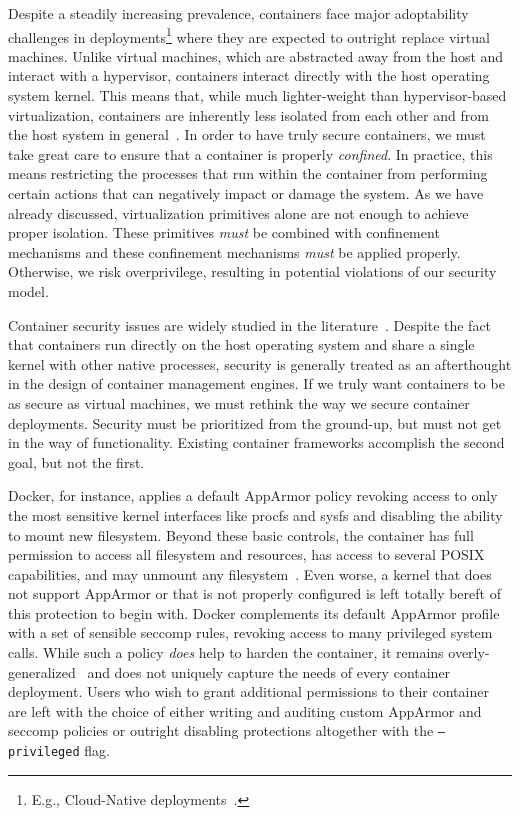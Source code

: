 Despite a steadily increasing prevalence, containers face major adoptability challenges in
deployments\footnote{E.g., Cloud-Native deployments~\cite{brady2020_docker_cloud}.} where
they are expected to outright replace virtual machines. Unlike virtual machines, which are
abstracted away from the host and interact with a hypervisor, containers interact directly
with the host operating system kernel. This means that, while much lighter-weight than
hypervisor-based virtualization, containers are inherently less isolated from each other
and from the host system in general~\cite{sultan2019_container_security,
lin2018_container_security, mullinix2020_security_measures, bui2015_docker_analysis}.  In
order to have truly secure containers, we must take great care to ensure that a container
is properly \textit{confined}. In practice, this means restricting the processes that run
within the container from performing certain actions that can negatively impact or damage
the system.  As we have already discussed, virtualization primitives alone are not enough
to achieve proper isolation. These primitives \textit{must} be combined with confinement
mechanisms and these confinement mechanisms \textit{must} be applied properly. Otherwise,
we risk overprivilege, resulting in potential violations of our security model.

Container security issues are widely studied in the
literature~\cite{sultan2019_container_security, lin2018_container_security,
mp2016_hardening, mullinix2020_security_measures, bui2015_docker_analysis}.  Despite the
fact that containers run directly on the host operating system and share a single kernel
with other native processes, security is generally treated as an afterthought in the
design of container management engines. If we truly want containers to be as secure as
virtual machines, we must rethink the way we secure container deployments. Security must
be prioritized from the ground-up, but must not get in the way of functionality. Existing
container frameworks accomplish the second goal, but not the first.

Docker, for instance, applies a default AppArmor policy revoking access to only the most
sensitive kernel interfaces like procfs and sysfs and disabling the ability to mount new
filesystem.  Beyond these basic controls, the container has full permission to access all
filesystem and resources, has access to several POSIX capabilities, and may unmount any
filesystem~\cite{docker_apparmor, docker_default_apparmor}. Even worse, a kernel that does
not support AppArmor or that is not properly configured is left totally bereft of this
protection to begin with. Docker complements its default AppArmor profile with a set of
sensible seccomp rules, revoking access to many privileged system calls. While such
a policy \textit{does} help to harden the container, it remains
overly-generalized~\cite{sultan2019_container_security} and does not uniquely capture the
needs of every container deployment. Users who wish to grant additional permissions to
their container are left with the choice of either writing and auditing custom AppArmor
and seccomp policies or outright disabling protections altogether with the
\texttt{--privileged} flag.

